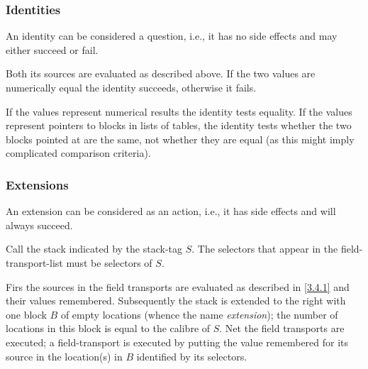 \documentclass{article}
\newcommand\g[1]{{\sf #1}}
\begin{document}
\subsubsection{Identities}\label{3.4.2}

An \g{identity} can be considered a question, i.e., it has no side
effects and may either succeed or fail.

Both its \g{source}s are evaluated as
described above. If the two values are numerically equal the \g{identity}
succeeds, otherwise it fails.

If the values represent numerical results the \g{identity} tests equality.
If the values represent pointers to blocks in lists of tables, the
\g{identity} tests whether the two blocks pointed at are the same, not
whether they are equal (as this might imply complicated comparison criteria).

\subsubsection{Extensions}\label{3.4.3}

An \g{extension} can be considered as an action, i.e., it has side
effects and will always succeed. 

Call the stack indicated by the \g{stack-tag} $S$. The \g{selector}s that
appear in the \g{field-transport-list} must be selectors of $S$.

Firs the \g{source}s in the \g{field transport}s are evaluated as described
in \ref{3.4.1} and their values remembered.
Subsequently the stack is extended to the right with one block $B$
 of empty locations
(whence the name \emph{extension}); the number of locations in this block is
equal to the calibre of $S$. Net the
\g{field transport}s are executed; a \g{field-transport} is executed by
putting the value remembered for its \g{source} in the location(s) in $B$
identified by its \g{selector}s.
\end{document}
